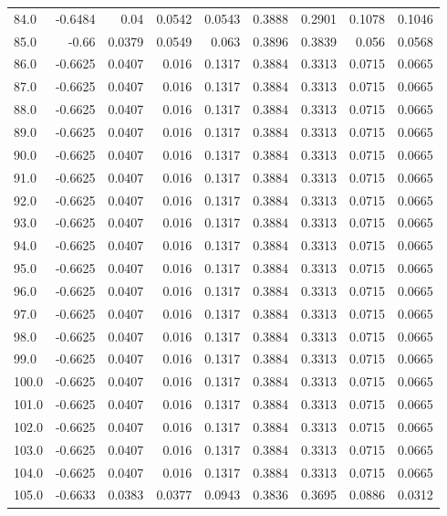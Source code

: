 \begin{longtable}{lrrrrrrrr}
84.0 & -0.6484 & 0.04 & 0.0542 & 0.0543 & 0.3888 & 0.2901 & 0.1078 & 0.1046 \\
85.0 & -0.66 & 0.0379 & 0.0549 & 0.063 & 0.3896 & 0.3839 & 0.056 & 0.0568 \\
86.0 & -0.6625 & 0.0407 & 0.016 & 0.1317 & 0.3884 & 0.3313 & 0.0715 & 0.0665 \\
87.0 & -0.6625 & 0.0407 & 0.016 & 0.1317 & 0.3884 & 0.3313 & 0.0715 & 0.0665 \\
88.0 & -0.6625 & 0.0407 & 0.016 & 0.1317 & 0.3884 & 0.3313 & 0.0715 & 0.0665 \\
89.0 & -0.6625 & 0.0407 & 0.016 & 0.1317 & 0.3884 & 0.3313 & 0.0715 & 0.0665 \\
90.0 & -0.6625 & 0.0407 & 0.016 & 0.1317 & 0.3884 & 0.3313 & 0.0715 & 0.0665 \\
91.0 & -0.6625 & 0.0407 & 0.016 & 0.1317 & 0.3884 & 0.3313 & 0.0715 & 0.0665 \\
92.0 & -0.6625 & 0.0407 & 0.016 & 0.1317 & 0.3884 & 0.3313 & 0.0715 & 0.0665 \\
93.0 & -0.6625 & 0.0407 & 0.016 & 0.1317 & 0.3884 & 0.3313 & 0.0715 & 0.0665 \\
94.0 & -0.6625 & 0.0407 & 0.016 & 0.1317 & 0.3884 & 0.3313 & 0.0715 & 0.0665 \\
95.0 & -0.6625 & 0.0407 & 0.016 & 0.1317 & 0.3884 & 0.3313 & 0.0715 & 0.0665 \\
96.0 & -0.6625 & 0.0407 & 0.016 & 0.1317 & 0.3884 & 0.3313 & 0.0715 & 0.0665 \\
97.0 & -0.6625 & 0.0407 & 0.016 & 0.1317 & 0.3884 & 0.3313 & 0.0715 & 0.0665 \\
98.0 & -0.6625 & 0.0407 & 0.016 & 0.1317 & 0.3884 & 0.3313 & 0.0715 & 0.0665 \\
99.0 & -0.6625 & 0.0407 & 0.016 & 0.1317 & 0.3884 & 0.3313 & 0.0715 & 0.0665 \\
100.0 & -0.6625 & 0.0407 & 0.016 & 0.1317 & 0.3884 & 0.3313 & 0.0715 & 0.0665 \\
101.0 & -0.6625 & 0.0407 & 0.016 & 0.1317 & 0.3884 & 0.3313 & 0.0715 & 0.0665 \\
102.0 & -0.6625 & 0.0407 & 0.016 & 0.1317 & 0.3884 & 0.3313 & 0.0715 & 0.0665 \\
103.0 & -0.6625 & 0.0407 & 0.016 & 0.1317 & 0.3884 & 0.3313 & 0.0715 & 0.0665 \\
104.0 & -0.6625 & 0.0407 & 0.016 & 0.1317 & 0.3884 & 0.3313 & 0.0715 & 0.0665 \\
105.0 & -0.6633 & 0.0383 & 0.0377 & 0.0943 & 0.3836 & 0.3695 & 0.0886 & 0.0312 \\

\end{longtable}
